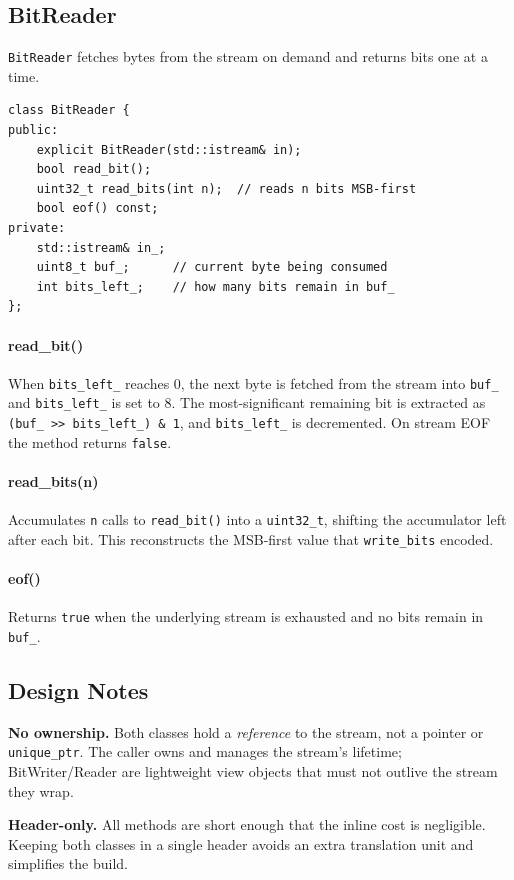 \subsection{BitReader}

\texttt{BitReader} fetches bytes from the stream on demand and returns bits one at a time.

\begin{lstlisting}[style=cpp]
class BitReader {
public:
    explicit BitReader(std::istream& in);
    bool read_bit();
    uint32_t read_bits(int n);  // reads n bits MSB-first
    bool eof() const;
private:
    std::istream& in_;
    uint8_t buf_;      // current byte being consumed
    int bits_left_;    // how many bits remain in buf_
};
\end{lstlisting}

\paragraph{read\_bit()}
When \texttt{bits\_left\_} reaches 0, the next byte is fetched from the stream into
\texttt{buf\_} and \texttt{bits\_left\_} is set to 8.
The most-significant remaining bit is extracted as
\texttt{(buf\_ >> bits\_left\_) \& 1}, and \texttt{bits\_left\_} is decremented.
On stream EOF the method returns \texttt{false}.

\paragraph{read\_bits(n)}
Accumulates \texttt{n} calls to \texttt{read\_bit()} into a \texttt{uint32\_t},
shifting the accumulator left after each bit.
This reconstructs the MSB-first value that \texttt{write\_bits} encoded.

\paragraph{eof()}
Returns \texttt{true} when the underlying stream is exhausted and no bits remain
in \texttt{buf\_}.

\subsection{Design Notes}

\textbf{No ownership.}
Both classes hold a \emph{reference} to the stream, not a pointer or \texttt{unique\_ptr}.
The caller owns and manages the stream's lifetime; BitWriter/Reader are lightweight
view objects that must not outlive the stream they wrap.

\textbf{Header-only.}
All methods are short enough that the inline cost is negligible.
Keeping both classes in a single header avoids an extra translation unit and
simplifies the build.
